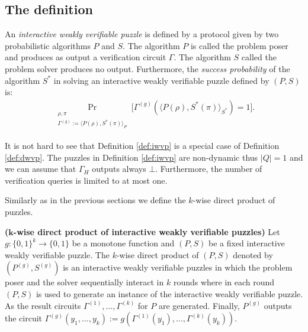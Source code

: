 \subsection{The definition}
\begin{definition}
  \label{def:iwvp}
An \textit{interactive weakly verifiable puzzle} is defined by a protocol given by two probabilistic algorithms $P$ and $S$.
The algorithm $P$ is called the problem poser and produces as output a verification circuit $\Gamma$.
The algorithm $S$ called the problem solver produces no output.
Furthermore, the \textit{success probability} of the algorithm $S^*$ in solving an interactive weakly verifiable puzzle defined by $(P,S)$ is:
\begin{align*}
  \underset{\substack{\rho, \pi \\ \Gamma^{(g)} := \langle P(\rho), S^*(\pi) \rangle_{P}}}{\Pr}\Big[\Gamma^{(g)}(\langle P(\rho),S^*(\pi) \rangle_{S^*}) = 1 \Big].
\end{align*}
\end{definition}
It is not hard to see that Definition \ref{def:iwvp} is a special case of Definition \ref{def:dwvp}.
The puzzles in Definition \ref{def:iwvp} are non-dynamic thus $|Q| = 1$ and we can assume that $\Gamma_H$ outputs always $\bot$.
Furthermore, the number of verification queries is limited to at most one.

Similarly as in the previous sections we define the $k$-wise direct product of puzzles.
\begin{definition}\textbf{($\boldsymbol{k}$-wise direct product of interactive weakly verifiable puzzles)}
Let $g: \{0,1\}^{k} \rightarrow \{0,1\}$ be a monotone function and $(P,S)$ be a fixed interactive weakly verifiable puzzle.
The $k$-wise direct product of $(P,S)$ denoted by $(P^{(g)}, S^{(g)})$ is an interactive weakly verifiable puzzles in which the problem poser and the solver
sequentially interact in $k$ rounds where in each round $(P,S)$ is used to generate an instance of the interactive weakly verifiable puzzle.
As the result circuits $\Gamma^{(1)}, \dotsc, \Gamma^{(k)}$ for $P$ are generated.
Finally, $P^{(g)}$ outputs the circuit $\Gamma^{(g)}(y_1, \dotsc, y_k) := g(\Gamma^{(1)}(y_1), \dotsc, \Gamma^{(k)}(y_k))$.
\end{definition}

